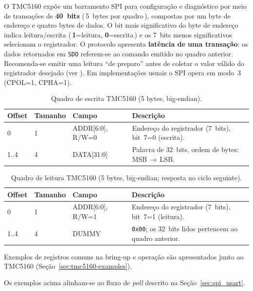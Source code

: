 O TMC5160 expõe um barramento SPI para configuração e diagnóstico por meio de
transações de \textbf{40~bits} (\,5~bytes por quadro\,), compostas por um byte de
endereço e quatro bytes de dados. O bit mais significativo do byte de endereço
indica leitura/escrita (\,\textbf{1}=leitura, \textbf{0}=escrita\,) e os 7~bits menos
significativos selecionam o registrador. O protocolo apresenta \textbf{latência de uma transação}:
os dados retornados em \texttt{SDO} referem-se ao comando emitido no quadro anterior.
Recomenda-se emitir uma leitura “de preparo” antes de coletar o valor válido do
registrador desejado (ver \cite{tmc5160_ds}). Em implementações usuais o SPI opera
em modo~3 (CPOL=1, CPHA=1).

\begin{table}[h]
  \centering
  \caption{Quadro de escrita TMC5160 (5 bytes, big-endian).}
  \label{tab:tmc5160-write}
  \setlength{\tabcolsep}{4pt}\footnotesize
  \begin{tabularx}{\textwidth}{lllX}
    \toprule
    Offset & Tamanho & Campo & Descrição \\
    \midrule
    0 & 1 & ADDR[6:0], R/W=0 & Endereço do registrador (7~bits), bit~7=0 (escrita). \\
    1..4 & 4 & DATA[31:0] & Palavra de 32~bits, ordem de bytes: MSB\,$\to$\,LSB. \\
    \bottomrule
  \end{tabularx}
\end{table}

\begin{table}[h]
  \centering
  \caption{Quadro de leitura TMC5160 (5 bytes, big-endian; resposta no ciclo seguinte).}
  \label{tab:tmc5160-read}
  \setlength{\tabcolsep}{4pt}\footnotesize
  \begin{tabularx}{\textwidth}{lllX}
    \toprule
    Offset & Tamanho & Campo & Descrição \\
    \midrule
    0 & 1 & ADDR[6:0], R/W=1 & Endereço do registrador (7~bits), bit~7=1 (leitura). \\
    1..4 & 4 & DUMMY & \texttt{0x00}; os 32~bits lidos pertencem ao quadro anterior. \\
    \bottomrule
  \end{tabularx}
\end{table}

\noindent Exemplos de registros comuns na bring-up e operação são apresentados
junto ao TMC5160 (Seção~\ref{sec:tmc5160-examples}).


Os exemplos acima alinham-se ao fluxo de \emph{poll} descrito na
Seção~\ref{sec:spi_usart}.
